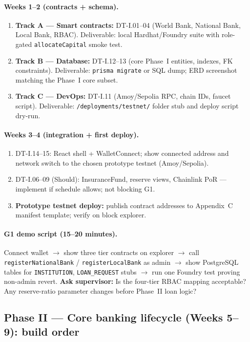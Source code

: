 \documentclass[12pt,a4paper]{report}
\begin{document}
\paragraph{Weeks 1--2 (contracts + schema).}
\begin{enumerate}[noitemsep]
\item \textbf{Track A --- Smart contracts:} DT-I.01--04 (World Bank, National Bank, Local Bank, RBAC). Deliverable: local Hardhat/Foundry suite with role-gated \texttt{allocateCapital} smoke test.
\item \textbf{Track B --- Database:} DT-I.12--13 (core Phase~I entities, indexes, FK constraints). Deliverable: \texttt{prisma migrate} or SQL dump; ERD screenshot matching the Phase~I core subset.
\item \textbf{Track C --- DevOps:} DT-I.11 (Amoy/Sepolia RPC, chain IDs, faucet script). Deliverable: \texttt{/deployments/testnet/} folder stub and deploy script dry-run.
\end{enumerate}

\paragraph{Weeks 3--4 (integration + first deploy).}
\begin{enumerate}[noitemsep]
\item DT-I.14--15: React shell + WalletConnect; show connected address and network switch to the chosen prototype testnet (Amoy/Sepolia).
\item DT-I.06--09 (Should): InsuranceFund, reserve views, Chainlink PoR --- implement if schedule allows; not blocking G1.
\item \textbf{Prototype testnet deploy:} publish contract addresses to Appendix~C manifest template; verify on block explorer.
\end{enumerate}

\paragraph{G1 demo script (15--20 minutes).}
Connect wallet $\to$ show three tier contracts on explorer $\to$ call \texttt{registerNationalBank} / \texttt{registerLocalBank} as admin $\to$ show PostgreSQL tables for \texttt{INSTITUTION}, \texttt{LOAN\_REQUEST} stubs $\to$ run one Foundry test proving non-admin revert. \textbf{Ask supervisor:} Is the four-tier RBAC mapping acceptable? Any reserve-ratio parameter changes before Phase~II loan logic?

\subsection{Phase II --- Core banking lifecycle (Weeks 5--9): build order}
\end{document}
